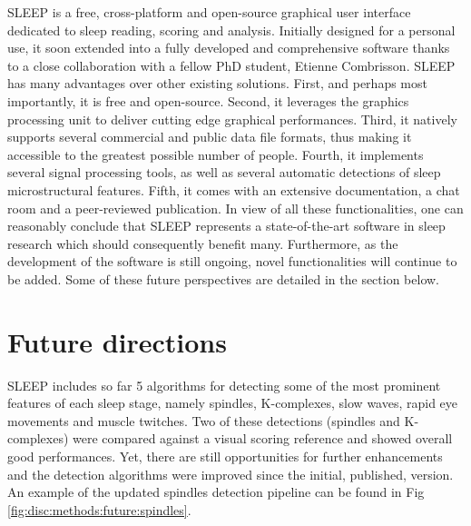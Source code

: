 SLEEP is a free, cross-platform and open-source graphical user interface dedicated to sleep reading, scoring and analysis. Initially designed for a personal use, it soon extended into a fully developed and comprehensive software thanks to a close collaboration with a fellow PhD student, Etienne Combrisson. SLEEP has many advantages over other existing solutions. First, and perhaps most importantly, it is free and open-source. Second, it leverages the graphics processing unit to deliver cutting edge graphical performances. Third, it natively supports several commercial and public data file formats, thus making it accessible to the greatest possible number of people. Fourth, it implements several signal processing tools, as well as several automatic detections of sleep microstructural features. Fifth, it comes with an extensive documentation, a chat room and a peer-reviewed publication. In view of all these functionalities, one can reasonably conclude that SLEEP represents a state-of-the-art software in sleep research which should consequently benefit many. Furthermore, as the development of the software is still ongoing, novel functionalities will continue to be added. Some of these future perspectives are detailed in the section below.

\section{Future directions}
\label{disc:methods:future}

SLEEP includes so far 5 algorithms for detecting some of the most prominent features of each sleep stage, namely spindles, K-complexes, slow waves, rapid eye movements and muscle twitches. Two of these detections (spindles and K-complexes) were compared against a visual scoring reference and showed overall good performances. Yet, there are still opportunities for further enhancements and the detection algorithms were improved since the initial, published, version. An example of the updated spindles detection pipeline can be found in Fig \ref{fig:disc:methods:future:spindles}.

